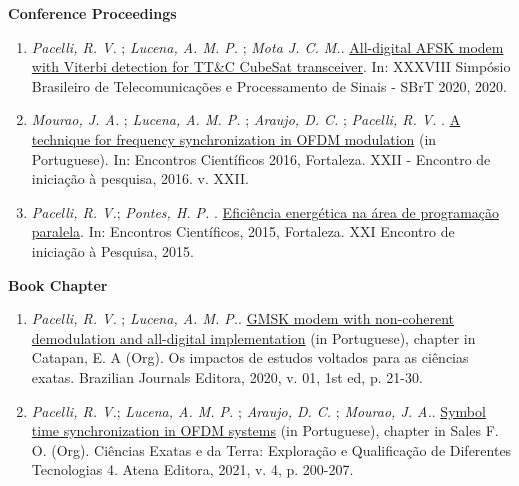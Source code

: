\textbf{Conference Proceedings}
\begin{enumerate}[label=\textbf{C\arabic*.}, align=left, leftmargin=1.5cm]
    \item \textit{Pacelli, R. V.} ; \textit{Lucena, A. M. P.} ; \textit{Mota J. C. M.}. \href{http://www.sbrt.org.br/sbrt2020/papers/1570654898.pdf}{All-digital AFSK modem with Viterbi detection for TT\&C CubeSat transceiver}. In: XXXVIII Simpósio Brasileiro de Telecomunicações e Processamento de Sinais - SBrT 2020, 2020.
    \item \textit{Mourao, J. A.} ; \textit{Lucena, A. M. P.} ; \textit{Araujo, D. C.} ; \textit{Pacelli, R. V.} . \href{https://uol.unifor.br/oul/conteudosite/?cdConteudo=6946081}{A technique for frequency synchronization in OFDM modulation} (in Portuguese). In: Encontros Científicos 2016, Fortaleza. XXII - Encontro de iniciação à pesquisa, 2016. v. XXII.
    \item \textit{Pacelli, R. V.}; \textit{Pontes, H. P.} . \href{https://uol.unifor.br/oul/conteudosite/?cdConteudo=6111841}{Eficiência energética na área de programação paralela}. In: Encontros Científicos, 2015, Fortaleza. XXI Encontro de iniciação à Pesquisa, 2015.
\end{enumerate}

\newpage

\textbf{Book Chapter}
\begin{enumerate}[label=\textbf{BC\arabic*.}, align=left, leftmargin=1.5cm]
    \item \textit{Pacelli, R. V.} ; \textit{Lucena, A. M. P.}. \href{https://www.brazilianjournals.com.br/assets/ebooks/2c9747ceb79e967166c7d80a9ff8e1da.pdf}{GMSK modem with non-coherent demodulation and all-digital implementation} (in Portuguese), chapter in Catapan, E. A (Org). Os impactos de estudos voltados para as ciências exatas. Brazilian Journals Editora, 2020, v. 01, 1st ed, p. 21-30.
    \item \textit{Pacelli, R. V.}; \textit{Lucena, A. M. P.} ; \textit{Araujo, D. C.} ; \textit{Mourao, J. A.}. \href{https://www.finersistemas.com/atenaeditora/index.php/admin/api/ebookPDF/3771}{Symbol time synchronization in OFDM systems} (in Portuguese), chapter in Sales F. O. (Org). Ciências Exatas e da Terra: Exploração e Qualificação de Diferentes Tecnologias 4. Atena Editora, 2021, v. 4, p. 200-207.
\end{enumerate}